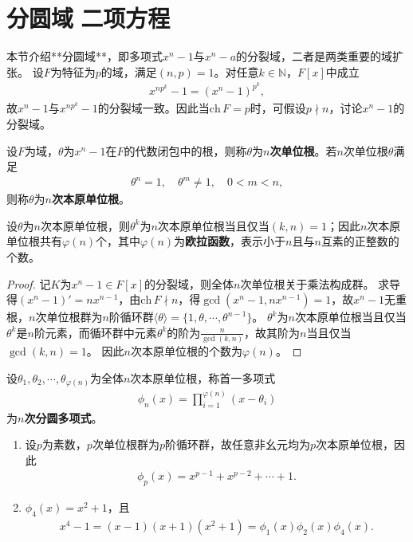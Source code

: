 \documentclass[../../main.tex]{subfiles}%
\begin{document}
\section{分圆域$\,\,$二项方程}

本节介绍**分圆域**，即多项式$x^n-1$与$x^n-a$的分裂域，二者是两类重要的域扩张。
设$F$为特征为$p$的域，满足$(n,p)=1$。对任意$k\in\mathbb{N}$，$F[x]$中成立
\begin{align*}
x^{np^k}-1=(x^n-1)^{p^k},
\end{align*}
故$x^n-1$与$x^{np^k}-1$的分裂域一致。因此当$\mathrm{ch}\,F=p$时，可假设$p\nmid n$，讨论$x^n-1$的分裂域。

\begin{definition}
设$F$为域，$\theta$为$x^n-1$在$F$的代数闭包中的根，则称$\theta$为\textbf{$n$次单位根}。若$n$次单位根$\theta$满足
\begin{align*}
\theta^n=1,\quad \theta^m\neq1,\quad 0<m<n,
\end{align*}
则称$\theta$为\textbf{$n$次本原单位根}。
\end{definition}

\begin{theorem}
设$\theta$为$n$次本原单位根，则$\theta^k$为$n$次本原单位根当且仅当$(k,n)=1$；因此$n$次本原单位根共有$\varphi(n)$个，其中$\varphi(n)$为\textbf{欧拉函数}，表示小于$n$且与$n$互素的正整数的个数。
\end{theorem}
\begin{proof}

记$K$为$x^n-1\in F[x]$的分裂域，则全体$n$次单位根关于乘法构成群。
求导得$(x^n-1)'=nx^{n-1}$，由$\mathrm{ch}\,F\nmid n$，得$\gcd(x^n-1,nx^{n-1})=1$，故$x^n-1$无重根，$n$次单位根群为$n$阶循环群$\langle\theta\rangle=\{1,\theta,\cdots,\theta^{n-1}\}$。
$\theta^k$为$n$次本原单位根当且仅当$\theta^k$是$n$阶元素，而循环群中元素$\theta^k$的阶为$\frac{n}{\gcd(k,n)}$，故其阶为$n$当且仅当$\gcd(k,n)=1$。
因此$n$次本原单位根的个数为$\varphi(n)$。

\end{proof}

\begin{definition}
设$\theta_1,\theta_2,\cdots,\theta_{\varphi(n)}$为全体$n$次本原单位根，称首一多项式
\begin{align*}
\phi_n(x)=\prod\limits_{i=1}^{\varphi(n)}(x-\theta_i)
\end{align*}
为\textbf{$n$次分圆多项式}。
\end{definition}

\begin{examples}
\begin{enumerate}[(1)]
\item 设$p$为素数，$p$次单位根群为$p$阶循环群，故任意非幺元均为$p$次本原单位根，因此
\begin{align*}
\phi_p(x)=x^{p-1}+x^{p-2}+\cdots+1.
\end{align*}
\item $\phi_4(x)=x^2+1$，且
\begin{align*}
x^4-1=(x-1)(x+1)(x^2+1)=\phi_1(x)\phi_2(x)\phi_4(x).
\end{align*}
\end{enumerate}
\end{examples}
\end{document}
